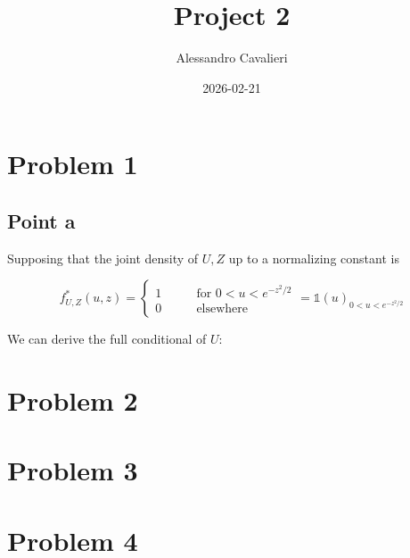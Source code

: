 \documentclass[
]{article}
\title{Project 2}
\author{Alessandro Cavalieri}
\date{2026-02-21}
\begin{document}
\maketitle

\hypertarget{problem-1}{%
\section{Problem 1}\label{problem-1}}

\hypertarget{point-a}{%
\subsection{Point a}\label{point-a}}

Supposing that the joint density of \(U, Z\) up to a normalizing
constant is

\[
f^*_{U,Z}(u,z) = \begin{cases}1 & \quad \quad \text{for } 0<u<e^{-z^2/2} \\
0 & \quad \quad \text{elsewhere}
\end{cases} = \mathds{1} (u)_{0<u<e^{-z^2/2}}
\]

We can derive the full conditional of \(U\):

\hypertarget{problem-2}{%
\section{Problem 2}\label{problem-2}}

\hypertarget{problem-3}{%
\section{Problem 3}\label{problem-3}}

\hypertarget{problem-4}{%
\section{Problem 4}\label{problem-4}}
\end{document}
